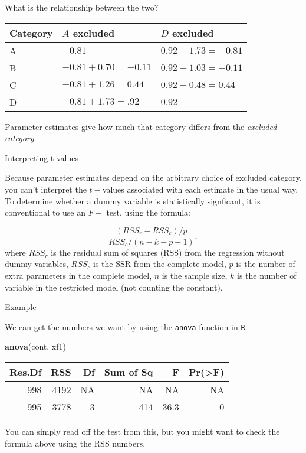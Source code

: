 \documentclass[10pt,ignorenonframetext,]{beamer}
\newenvironment{Shaded}{\begin{snugshade}}{\end{snugshade}}
\newcommand{\KeywordTok}[1]{\textcolor[rgb]{0.13,0.29,0.53}{\textbf{#1}}}
\newcommand{\NormalTok}[1]{#1}
\begin{document}
\begin{frame}{What is the relationship between the two?}

\begin{longtable}[]{@{}lll@{}}
\toprule
Category & \(A\) excluded & \(D\) excluded\tabularnewline
\midrule
\endhead
A & \(-0.81\) & \(0.92 - 1.73 = -0.81\)\tabularnewline
B & \(-0.81 + 0.70 = -0.11\) & \(0.92 - 1.03 = -0.11\)\tabularnewline
C & \(-0.81 + 1.26 = 0.44\) & \(0.92 - 0.48 = 0.44\)\tabularnewline
D & \(-0.81 + 1.73 = .92\) & \(0.92\)\tabularnewline
\bottomrule
\end{longtable}

Parameter estimates give how much that category differs from the
\emph{excluded category}.

\end{frame}

\begin{frame}{Interpreting t-values}

Because parameter estimates depend on the arbitrary choice of excluded
category, you can't interpret the \(t-\)values associated with each
estimate in the usual way. To determine whether a dummy variable is
statistically signficant, it is conventional to use an \(F-\) test,
using the formula:

\[
\frac{(RSS_r - RSS_c)/p}{RSS_c/(n-k-p-1)},
\] where \(RSS_r\) is the residual sum of squares (RSS) from the
regression without dummy variables, \(RSS_c\) is the SSR from the
complete model, \(p\) is the number of extra parameters in the complete
model, \(n\) is the sample size, \(k\) is the number of variable in the
restricted model (not counting the constant).

\end{frame}

\begin{frame}[fragile]{Example}

We can get the numbers we want by using the \texttt{anova} function in
\texttt{R}.

\begin{Shaded}
\begin{Highlighting}[]
\KeywordTok{anova}\NormalTok{(cont, xf1)}
\end{Highlighting}
\end{Shaded}

\begin{longtable}[]{@{}rrrrrr@{}}
\toprule
Res.Df & RSS & Df & Sum of Sq & F & Pr(\textgreater{}F)\tabularnewline
\midrule
\endhead
998 & 4192 & NA & NA & NA & NA\tabularnewline
995 & 3778 & 3 & 414 & 36.3 & 0\tabularnewline
\bottomrule
\end{longtable}

You can simply read off the test from this, but you might want to check
the formula above using the RSS numbers.

\end{frame}
\end{document}

